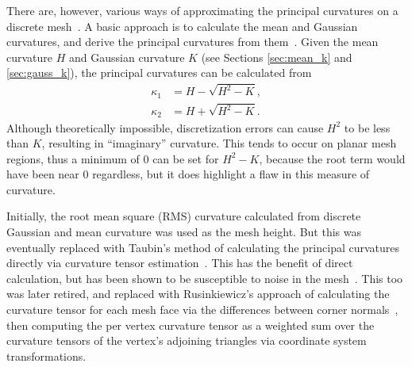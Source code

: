There are, however, various ways of approximating the principal curvatures on a discrete mesh~\cite{EstCurvOnTriMesh, DiscDiffGeoOpsTriMani}.
A basic approach is to calculate the mean and Gaussian curvatures, and derive the principal curvatures from them~\cite{DDGAppIntro_19_discrete_k_2, Gauss_mean_k_notes}.
Given the mean curvature $H$ and Gaussian curvature $K$ (see Sections \ref{sec:mean_k} and \ref{sec:gauss_k}), the principal curvatures can be calculated from
\begin{align*}
	\kappa_1 &= H - \sqrt{H^2 - K}, \\
	\kappa_2 &= H + \sqrt{H^2 - K}.
\end{align*}
Although theoretically impossible, discretization errors can cause $H^2$ to be less than $K$, resulting in ``imaginary'' curvature.
This tends to occur on planar mesh regions, thus a minimum of 0 can be set for $H^2 - K$, because the root term would have been near 0 regardless, but it does highlight a flaw in this measure of curvature.

Initially, the root mean square (RMS) curvature calculated from discrete Gaussian and mean curvature was used as the mesh height.
But this was eventually replaced with Taubin's method of calculating the principal curvatures directly via curvature tensor estimation~\cite{TaubinTensor}.
This has the benefit of direct calculation, but has been shown to be susceptible to noise in the mesh~\cite{Comp_k_notes}.
This too was later retired, and replaced with Rusinkiewicz's approach of calculating the curvature tensor for each mesh face via the differences between corner normals~\cite{SRTensor}, then computing the per vertex curvature tensor as a weighted sum over the curvature tensors of the vertex's adjoining triangles via coordinate system transformations.

